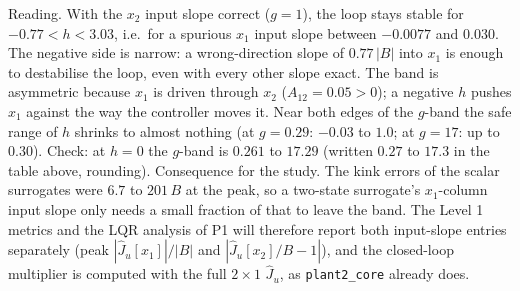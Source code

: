 \documentclass[10.5pt]{article}
\begin{document}
\noindent Reading. With the $x_2$ input slope correct ($g=1$), the loop stays stable for $-0.77<h<3.03$, i.e.\ for a spurious
$x_1$ input slope between $-0.0077$ and $0.030$. The negative side is narrow: a wrong-direction slope of $0.77\,|B|$ into
$x_1$ is enough to destabilise the loop, even with every other slope exact. The band is asymmetric because $x_1$ is driven
through $x_2$ ($A_{12}=0.05>0$); a negative $h$ pushes $x_1$ against the way the controller moves it. Near both edges of the
$g$-band the safe range of $h$ shrinks to almost nothing (at $g=0.29$: $-0.03$ to $1.0$; at $g=17$: up to $0.30$). Check: at
$h=0$ the $g$-band is $0.261$ to $17.29$ (written $0.27$ to $17.3$ in the table above, rounding).
Consequence for the study. The kink errors of the scalar surrogates were $6.7$ to $201\,B$ at the peak, so a two-state
surrogate's $x_1$-column input slope only needs a small fraction of that to leave the band. The Level 1 metrics and the LQR
analysis of P1 will therefore report both input-slope entries separately (peak $|\hat J_u[x_1]|/|B|$ and
$|\hat J_u[x_2]/B-1|$), and the closed-loop multiplier is computed with the full $2\times1$ $\hat J_u$, as
\texttt{plant2\_core} already does.
\end{document}
